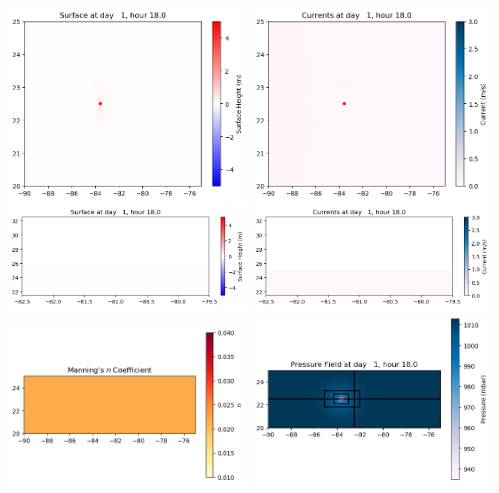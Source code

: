 \documentclass[11pt]{article}
\begin{document}
\vskip 10pt 
\includegraphics[width=0.475\textwidth]{frame0007fig1001.png}
\includegraphics[width=0.475\textwidth]{frame0007fig1002.png}
\vskip 10pt 
\includegraphics[width=0.475\textwidth]{frame0007fig1003.png}
\includegraphics[width=0.475\textwidth]{frame0007fig1004.png}
\vskip 10pt 
\includegraphics[width=0.475\textwidth]{frame0007fig1005.png}
\includegraphics[width=0.475\textwidth]{frame0007fig1006.png}
\end{document}
